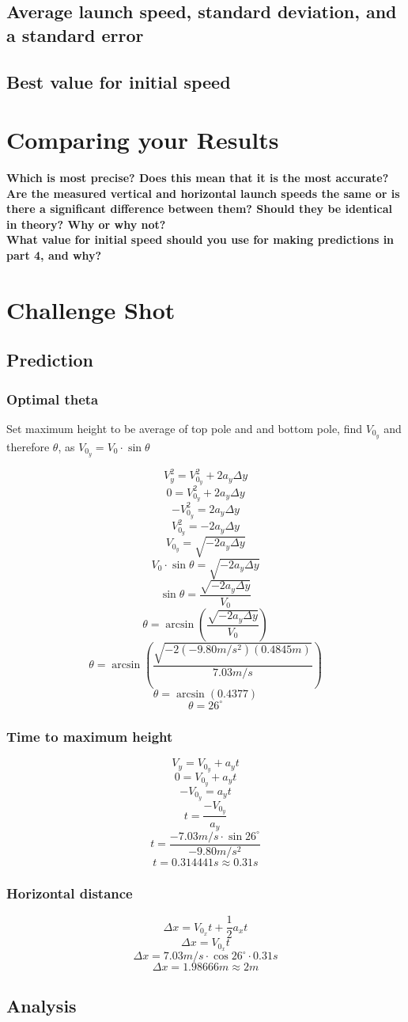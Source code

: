 \documentclass[11pt, letterpaper, includehead]{article}
\begin{document}
\subsection{Average launch speed, standard deviation, and a standard error} %
\subsection{Best value for initial speed} %

\section{Comparing your Results} %
\textbf{Which is most precise? Does this mean that it is the most accurate?}\\ 

\textbf{Are the measured vertical and horizontal launch speeds the same or is there a
significant difference between them? Should they be identical in theory? Why or
why not?}\\

\textbf{What value for initial speed should you use for making predictions in part 4, and
why?}

\section{Challenge Shot} %
\subsection{Prediction} %
\subsubsection{Optimal theta} %
Set maximum height to be average of top pole and and bottom pole, find $V_{0_y}$ and therefore $\theta$,
as $V_{0_y} = V_0\cdot\sin\theta$

$$V_y^2 = V_{0_y}^2 + 2a_y\Delta y$$
$$0 = V_{0_y}^2 + 2a_y\Delta y$$
$$-V_{0_y}^2 = 2a_y\Delta y$$
$$V_{0_y}^2 = -2a_y\Delta y$$
$$V_{0_y} = \sqrt{-2a_y\Delta y}$$
$$V_0\cdot\sin\theta = \sqrt{-2a_y\Delta y}$$
$$\sin\theta = \frac{\sqrt{-2a_y\Delta y}}{V_0}$$
$$\theta = \arcsin\left(\frac{\sqrt{-2a_y\Delta y}}{V_0}\right)$$
$$\theta = \arcsin\left(\frac{\sqrt{-2(-9.80m/s^2)(0.4845m)}}{7.03m/s}\right)$$
$$\theta = \arcsin(0.4377)$$
$$\theta = 26^{\circ}$$
\subsubsection{Time to maximum height} %
$$V_y = V_{0_y} + a_yt$$
$$0 = V_{0_y} + a_yt$$
$$-V_{0_y} = a_yt$$
$$t = \frac{-V_{0_y}}{a_y}$$
$$t = \frac{-7.03m/s\cdot\sin26^{\circ}}{-9.80m/s^2}$$
$$t = 0.314441s \approx 0.31s$$
\subsubsection{Horizontal distance} %
$$\Delta x = V_{0_x}t + \frac{1}{2}a_xt$$
$$\Delta x = V_{0_x}t$$
$$\Delta x = 7.03m/s\cdot \cos26^{\circ}\cdot 0.31s$$
$$\Delta x = 1.98666m \approx 2m$$
\subsection{Analysis}  %
\end{document}
